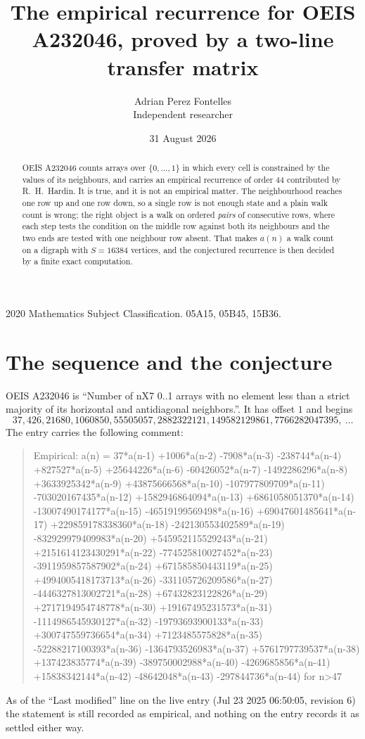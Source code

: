 \documentclass[11pt,a4paper]{article}
\title{The empirical recurrence for OEIS A232046, proved by a two-line transfer matrix}
\author{Adrian Perez Fontelles\\ \small Independent researcher}
\date{31 August 2026}
\theoremstyle{plain}
\theoremstyle{definition}
\begin{document}
\maketitle

\begin{abstract}
OEIS A232046 counts arrays over $\{0,\dots,1\}$ in which every cell is constrained by the
values of its neighbours, and carries an empirical recurrence of order $44$ contributed
by R.~H.~Hardin. It is true, and it is not an empirical matter. The neighbourhood reaches one
row up and one row down, so a single row is not enough state and a plain walk count
is wrong; the right object is a walk on ordered \emph{pairs} of consecutive rows, where
each step tests the condition on the middle row against both its neighbours and the two
ends are tested with one neighbour row absent. That makes $a(n)$ a walk count on a digraph
with $S=16384$ vertices, and the conjectured recurrence is then decided by a finite exact
computation.
\end{abstract}

\noindent\small 2020 Mathematics Subject Classification. 05A15, 05B45, 15B36.\normalsize

\section{The sequence and the conjecture}

OEIS A232046 is ``Number of nX7 0..1 arrays with no element less than a strict majority of its horizontal and antidiagonal neighbors.''. It has offset $1$ and begins
\[
37, 426, 21680, 1060850, 55505057, 2882322121, 149582129861, 7766282047395,\ \dots
\]
The entry carries the following comment:
\begin{quote}\small
Empirical: a(n) = 37*a(n-1) +1006*a(n-2) -7908*a(n-3) -238744*a(n-4) +827527*a(n-5) +25644226*a(n-6) -60426052*a(n-7) -1492286296*a(n-8) +3633925342*a(n-9) +43875666568*a(n-10) -107977809709*a(n-11) -703020167435*a(n-12) +1582946864094*a(n-13) +6861058051370*a(n-14) -13007490174177*a(n-15) -46519199569498*a(n-16) +69047601485641*a(n-17) +229859178338360*a(n-18) -242130553402589*a(n-19) -832929979409983*a(n-20) +545952115529243*a(n-21) +2151614123430291*a(n-22) -774525810027452*a(n-23) -3911959857587902*a(n-24) +671585850443119*a(n-25) +4994005418173713*a(n-26) -331105726209586*a(n-27) -4446327813002721*a(n-28) +67432823122826*a(n-29) +2717194954748778*a(n-30) +19167495231573*a(n-31) -1114986545930127*a(n-32) -19793693900133*a(n-33) +300747559736654*a(n-34) +7123485575828*a(n-35) -52288217100393*a(n-36) -1364793526983*a(n-37) +5761797739537*a(n-38) +137423835774*a(n-39) -389750002988*a(n-40) -4269685856*a(n-41) +15838342144*a(n-42) -48642048*a(n-43) -297844736*a(n-44) for n>47
\end{quote}
As of the ``Last modified'' line on the live entry (Jul 23 2025 06:50:05, revision 6) the statement is
still recorded as empirical, and nothing on the entry records it as settled either way.
\end{document}
